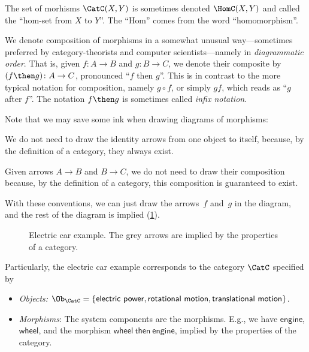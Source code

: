 \begin{remark}
The set of morhisms $\CatC(X, Y)$ is sometimes denoted $\HomC(X, Y)$ and called the ``hom-set from $X$ to $Y$''. The ``Hom'' comes from the word ``homomorphism''.
\end{remark}

\begin{remark}
We denote composition of morphisms in a somewhat unusual way---sometimes preferred by category-theorists and computer scientists---namely in \emph{diagrammatic order}. That is, given $f\colon A\to B$ and $g\colon B\to C$, we denote their composite by $(f\then g)\colon A\to C$, pronounced ``$f$ then $g$''. This is in contrast to the more typical notation for composition, namely $g\circ f$, or simply $gf$, which reads as ``$g$ after $f$''. The notation $f\then g$ is sometimes called \emph{infix notation}. 
\end{remark}


\noindent Note that we may save some ink when drawing diagrams of morphisms:
\begin{compactitem}
\item We do not need to draw the identity arrows from one object to itself, because, by the definition of a category, they always exist. 
\item  Given arrows $A\to B$ and $B \to C$, we do not need to draw their composition because, by the definition of a category, this composition is guaranteed to exist.
\end{compactitem}

With these conventions, we can just draw the arrows~$f$ and~$g$ in the diagram,
and the rest of the diagram is implied (\cref{fig:e5}). 

\begin{figure}[h!]
    \centering
    \caption{\label{fig:e5} Electric car example. The grey arrows are implied by the properties
    of a category.}
\end{figure}

Particularly, the electric car example corresponds to the category $\CatC$ specified by 
\begin{itemize}
    \item \emph{Objects:} $\Ob_\CatC=\{\mathsf{electric}\ \mathsf{power},\mathsf{rotational}\ \mathsf{motion},\mathsf{translational}\ \mathsf{motion}\}$.
    \item \emph{Morphisms}: The system components are the morphisms. E.g., we have $\mathsf{engine}$, $\mathsf{wheel}$, and the morphism $\mathsf{wheel \ then \ engine}$, implied by the properties of the category.
\end{itemize}

